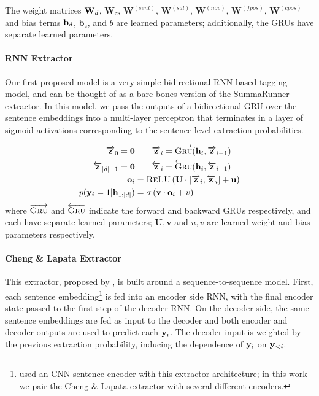 The weight matrices $\mathbf{W}_d$, $\mathbf{W}_z$, $\mathbf{W}^{(sent)}$,
$\mathbf{W}^{(sal)}$, $\mathbf{W}^{(nov)}$, $\mathbf{W}^{(fpos)}$,
$\mathbf{W}^{(cpos)}$ and bias terms $\mathbf{b}_d$, $\mathbf{b}_z$, and 
$b$ 
are learned parameters;
additionally, the GRUs have separate learned parameters.
%

\paragraph{RNN Extractor \citep{kedzie2018deep}}
    Our first proposed model is a very simple bidirectional
RNN based tagging model, and can be thought of as a 
bare bones version of the SummaRunner
extractor. In this model, we pass the outputs of a bidirectional GRU over the 
sentence embeddings into a multi-layer perceptron that terminates in a layer 
of
sigmoid activations corresponding to the sentence level extraction probabilities.



\begin{align}
    \overrightarrow{\mathbf{z}}_0 = \mathbf{0} &\quad\quad   \overrightarrow{\mathbf{z}}_i = \overrightarrow{\textsc{Gru}}(\mathbf{h}_i, \overrightarrow{\mathbf{z}}_{i-1}) \\
    \overleftarrow{\mathbf{z}}_{| d | + 1} = \mathbf{0}&\quad \quad    \overleftarrow{\mathbf{z}}_i = \overleftarrow{\textsc{Gru}}(\mathbf{h}_i, \overleftarrow{\mathbf{z}}_{i+1}) \\
    \mathbf{o}_i &= \textsc{ReLU}\left(\mathbf{U} \cdot [\overrightarrow{\mathbf{z}}_i; \overleftarrow{\mathbf{z}}_i] + \mathbf{u} \right)\\
    p(\mathbf{y}_i=1|\mathbf{h}_{1:| d |}) &= \sigma\left(\mathbf{v}\cdot \mathbf{o}_i + v  \right)
\end{align}
where $\overrightarrow{\textsc{Gru}}$ and $\overleftarrow{\textsc{Gru}}$ indicate the 
forward and backward GRUs respectively, and each have separate learned 
parameters; $\mathbf{U}, \mathbf{v}$ and $u, v$ are learned weight and 
bias parameters respectively.


\paragraph{Cheng \& Lapata Extractor} 
 This extractor, proposed by 
\citet{cheng2016neural}, %
is built around a sequence-to-sequence model.
First, each sentence embedding\footnote{\citet{cheng2016neural} used an CNN sentence encoder with 
this extractor architecture; in this work we pair the Cheng \& Lapata extractor
with several different encoders.} is
fed into an encoder side RNN, with the final encoder state passed to the
first step of the decoder RNN. On the decoder side, the same sentence 
embeddings are fed as input to the decoder and both encoder and decoder 
outputs are used to predict each $\mathbf{y}_i$. The decoder input is weighted by the previous 
extraction
probability, inducing the dependence of $\mathbf{y}_i$ on $\mathbf{y}_{<i}$.



